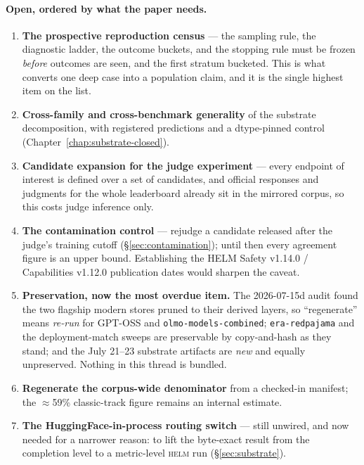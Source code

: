 \documentclass[11pt]{report}
\newcommand{\code}[1]{\texttt{#1}}
\begin{document}
\paragraph{Open, ordered by what the paper needs.}
\begin{enumerate}[nosep]
  \item \textbf{The prospective reproduction census} --- the sampling rule, the
        diagnostic ladder, the outcome buckets, and the stopping rule must be frozen
        \emph{before} outcomes are seen, and the first stratum bucketed. This is what
        converts one deep case into a population claim, and it is the single highest
        item on the list.
  \item \textbf{Cross-family and cross-benchmark generality} of the substrate
        decomposition, with registered predictions and a dtype-pinned control
        (Chapter~\ref{chap:substrate-closed}).
  \item \textbf{Candidate expansion for the judge experiment} --- every endpoint of
        interest is defined over a set of candidates, and official responses and
        judgments for the whole leaderboard already sit in the mirrored corpus, so
        this costs judge inference only.
  \item \textbf{The contamination control} --- rejudge a candidate released after the
        judge's training cutoff (\S\ref{sec:contamination}); until then every
        agreement figure is an upper bound. Establishing the HELM Safety v1.14.0 /
        Capabilities v1.12.0 publication dates would sharpen the caveat.
  \item \textbf{Preservation, now the most overdue item.} The 2026-07-15d audit found
        the two flagship modern stores pruned to their derived layers, so
        ``regenerate'' means \emph{re-run} for GPT-OSS and \code{olmo-models-combined};
        \code{era-redpajama} and the deployment-match sweeps are preservable by
        copy-and-hash as they stand; and the July 21--23 substrate artifacts are
        \emph{new} and equally unpreserved. Nothing in this thread is bundled.
  \item \textbf{Regenerate the corpus-wide denominator} from a checked-in manifest;
        the $\approx$59\% classic-track figure remains an internal estimate.
  \item \textbf{The HuggingFace-in-process routing switch} --- still unwired, and now
        needed for a narrower reason: to lift the byte-exact result from the
        completion level to a metric-level \textsc{helm} run (\S\ref{sec:substrate}).

\end{enumerate}
\end{document}
